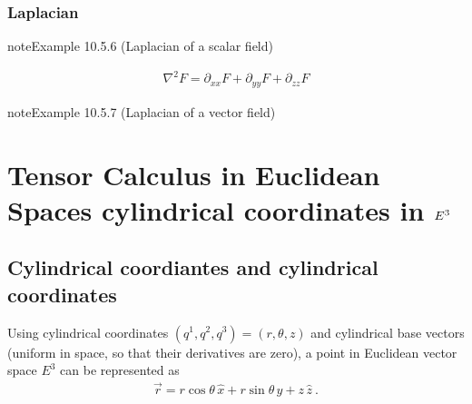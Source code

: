 \documentclass[letterpaper,10pt,english]{jupyterBook}
\begin{document}
\subsubsection{Laplacian}
\label{\detokenize{ch/tensor-algebra-calculus/calculus-euclidean-cartesian:laplacian}}\label{\detokenize{ch/tensor-algebra-calculus/calculus-euclidean-cartesian:tensor-calculus-cartesian-differential-operators-laplacian}}\label{ch/tensor-algebra-calculus/calculus-euclidean-cartesian:example-5}
\begin{sphinxadmonition}{note}{Example 10.5.6 (Laplacian of a scalar field)}


\begin{equation*}
\begin{split}\nabla^2 F = \partial_{xx} F + \partial_{yy} F + \partial_{zz} F\end{split}
\end{equation*}\end{sphinxadmonition}
\label{ch/tensor-algebra-calculus/calculus-euclidean-cartesian:example-6}
\begin{sphinxadmonition}{note}{Example 10.5.7 (Laplacian of a vector field)}


\end{sphinxadmonition}

\sphinxstepscope


\section{Tensor Calculus in Euclidean Spaces \sphinxhyphen{} cylindrical coordinates in \protect\(E^3\protect\)}
\label{\detokenize{ch/tensor-algebra-calculus/calculus-euclidean-cylindrical:tensor-calculus-in-euclidean-spaces-cylindrical-coordinates-in-e-3}}\label{\detokenize{ch/tensor-algebra-calculus/calculus-euclidean-cylindrical:tensor-calculus-cylindrical}}\label{\detokenize{ch/tensor-algebra-calculus/calculus-euclidean-cylindrical::doc}}

\subsection{Cylindrical coordiantes and cylindrical coordinates}
\label{\detokenize{ch/tensor-algebra-calculus/calculus-euclidean-cylindrical:cylindrical-coordiantes-and-cylindrical-coordinates}}\label{\detokenize{ch/tensor-algebra-calculus/calculus-euclidean-cylindrical:tensor-calculus-cylindrical-coordinates}}
\sphinxAtStartPar
Using cylindrical coordinates \((q^1, q^2, q^3) = (r, \theta, z)\) and cylindrical base vectors (uniform in space, so that their derivatives are zero), a point in Euclidean vector space \(E^3\) can be represented as
\begin{equation*}
\begin{split}\vec{r} = r \cos \theta \, \hat{x} + r \sin \theta \, \hat{y} + z \, \hat{z} \ .\end{split}
\end{equation*}
\end{document}
